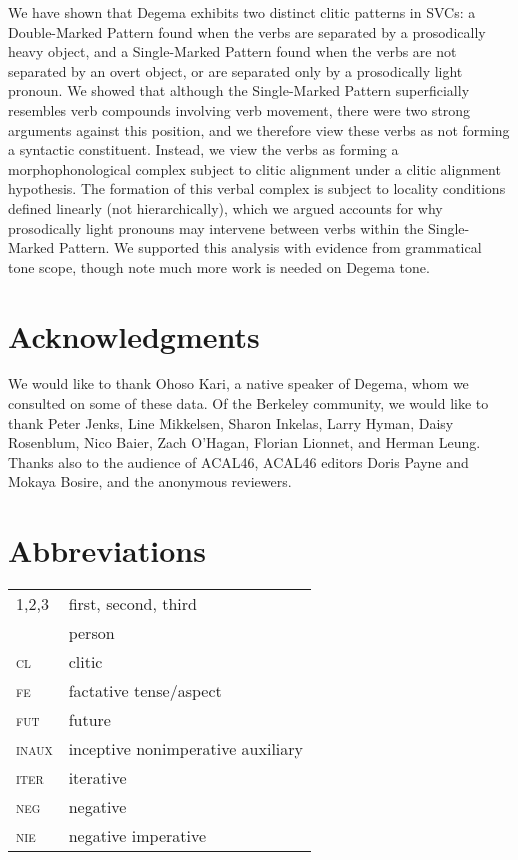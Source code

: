 \documentclass[output=paper]{langsci/langscibook}
\begin{document}
We have shown that Degema exhibits two distinct clitic patterns in SVCs: a Double-Marked Pattern found when the verbs are separated by a prosodically heavy object, and a Single-Marked Pattern found when the verbs are not separated by an overt object, or are separated only by a prosodically light pronoun. We showed that although the Single-Marked Pattern superficially resembles verb compounds involving verb movement, there were two strong arguments against this position, and we therefore view these verbs as not forming a syntactic constituent. Instead, we view the verbs as forming a morphophonological complex subject to clitic alignment under a clitic alignment hypothesis. The formation of this verbal complex is subject to locality conditions defined linearly (not hierarchically), which we argued accounts for why prosodically light pronouns may intervene between verbs within the Single-Marked Pattern. We supported this analysis with evidence from grammatical tone scope, though note much more work is needed on Degema tone.

\section*{Acknowledgments}


We would like to thank Ohoso Kari, a native speaker of Degema, whom we consulted on some of these data. Of the Berkeley community, we would like to thank Peter Jenks, Line Mikkelsen, Sharon Inkelas, Larry Hyman, Daisy Rosenblum, Nico Baier, Zach O’Hagan, Florian Lionnet, and Herman Leung. Thanks also to the audience of ACAL46, ACAL46 editors Doris Payne and Mokaya Bosire, and the anonymous reviewers.


\section*{Abbreviations}

\begin{tabularx}{.45\textwidth}{>{\scshape}lX}
1,2,3 & first, second, third \\

       & person \\

cl & clitic \\

fe & factative tense/aspect \\

fut & future \\

inaux & inceptive nonimperative auxiliary \\

iter & iterative \\

neg & negative \\

nie  & negative imperative \\

\end{tabularx}
\end{document}
